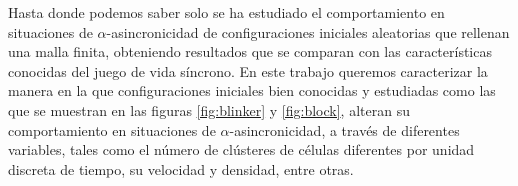 \documentclass[../proyecto.tex]{book}
\begin{document}
Hasta donde podemos saber solo se ha estudiado el comportamiento en situaciones de $\alpha$-asincronicidad de configuraciones iniciales aleatorias que rellenan una malla finita, obteniendo resultados que se comparan con las características conocidas del juego de vida síncrono. En este trabajo queremos caracterizar la manera en la que configuraciones iniciales bien conocidas y estudiadas como las que se muestran en las figuras \ref{fig:blinker} y \ref{fig:block}, alteran su comportamiento en situaciones de $\alpha$-asincronicidad, a través de diferentes variables, tales como el número de clústeres de células diferentes por unidad discreta de tiempo, su velocidad y densidad, entre otras.
\end{document}
